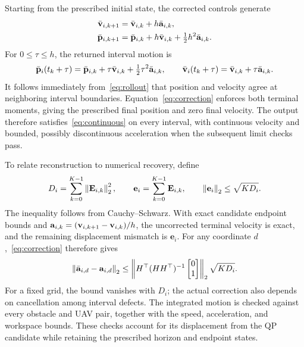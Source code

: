 Starting from the prescribed initial state, the corrected controls generate
\begin{subequations}\label{eq:rollout}\begin{align}
 \bar{\mathbf{v}}_{i,k+1}&=\bar{\mathbf{v}}_{i,k}+h\bar{\mathbf{a}}_{i,k},\\
 \bar{\mathbf{p}}_{i,k+1}&=\bar{\mathbf{p}}_{i,k}+h\bar{\mathbf{v}}_{i,k}+\tfrac12h^2\bar{\mathbf{a}}_{i,k}.
\end{align}\end{subequations}
For $0\leq\tau\leq h$, the returned interval motion is
\begin{equation}
 \bar{\mathbf{p}}_i(t_k+\tau)=\bar{\mathbf{p}}_{i,k}+\tau\bar{\mathbf{v}}_{i,k}
 +\tfrac12\tau^2\bar{\mathbf{a}}_{i,k},\qquad
 \bar{\mathbf{v}}_i(t_k+\tau)=\bar{\mathbf{v}}_{i,k}+\tau\bar{\mathbf{a}}_{i,k}.
 \label{eq:arc}
\end{equation}
It follows immediately from~\eqref{eq:rollout} that position and velocity agree at neighboring interval boundaries. Equation~\eqref{eq:correction} enforces both terminal moments, giving the prescribed final position and zero final velocity. The output therefore satisfies~\eqref{eq:continuous} on every interval, with continuous velocity and bounded, possibly discontinuous acceleration when the subsequent limit checks pass.

To relate reconstruction to numerical recovery, define
\begin{equation}
 D_i=\sum_{k=0}^{K-1}\left\lVert \mathbf E_{i,k}\right\rVert_2^2,\qquad
 \mathbf e_i=\sum_{k=0}^{K-1}\mathbf E_{i,k},\qquad
 \left\lVert \mathbf e_i\right\rVert_2\leq\sqrt{K D_i}.
 \label{eq:terminal-bound}
\end{equation}
The inequality follows from Cauchy--Schwarz. With exact candidate endpoint bounds and $\mathbf{a}_{i,k}=(\mathbf{v}_{i,k+1}-\mathbf{v}_{i,k})/h$, the uncorrected terminal velocity is exact, and the remaining displacement mismatch is $\mathbf e_i$. For any coordinate $d$,~\eqref{eq:correction} therefore gives
\begin{equation}
 \left\lVert \bar{\mathbf a}_{i,d}-\mathbf a_{i,d}\right\rVert_2
 \leq\left\|H^\top(HH^\top)^{-1}
 \begin{bmatrix}0\\1\end{bmatrix}\right\|_2\sqrt{K D_i}.
 \label{eq:correction-bound}
\end{equation}
For a fixed grid, the bound vanishes with $D_i$; the actual correction also depends on cancellation among interval defects. The integrated motion is checked against every obstacle and UAV pair, together with the speed, acceleration, and workspace bounds. These checks account for its displacement from the QP candidate while retaining the prescribed horizon and endpoint states.


